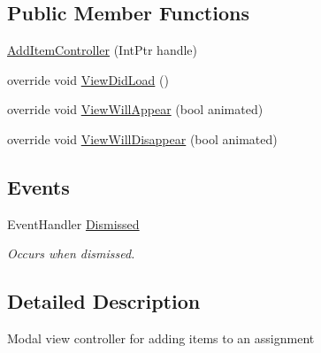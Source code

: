 \subsection*{Public Member Functions}
\begin{DoxyCompactItemize}
\item 
\hyperlink{class_field_service_1_1i_o_s_1_1_add_item_controller_a0944717610334d890f822507b2da625a}{Add\+Item\+Controller} (Int\+Ptr handle)
\item 
override void \hyperlink{class_field_service_1_1i_o_s_1_1_add_item_controller_aec460c4aee12e5666060a45bbf34bc34}{View\+Did\+Load} ()
\item 
override void \hyperlink{class_field_service_1_1i_o_s_1_1_add_item_controller_a87d94a2f28527bcdcbf4702c57c26eae}{View\+Will\+Appear} (bool animated)
\item 
override void \hyperlink{class_field_service_1_1i_o_s_1_1_add_item_controller_a20f40e456c496014fdd6286674832767}{View\+Will\+Disappear} (bool animated)
\end{DoxyCompactItemize}
\subsection*{Events}
\begin{DoxyCompactItemize}
\item 
Event\+Handler \hyperlink{class_field_service_1_1i_o_s_1_1_add_item_controller_a980e00b203141f92a82c4c2166b84ac2}{Dismissed}
\begin{DoxyCompactList}\small\item\em Occurs when dismissed. \end{DoxyCompactList}\end{DoxyCompactItemize}


\subsection{Detailed Description}
Modal view controller for adding items to an assignment 



